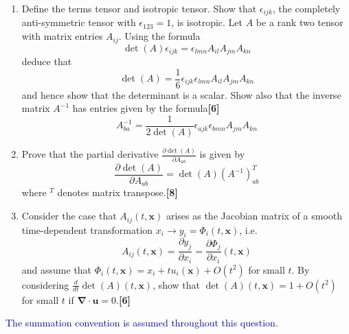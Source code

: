 \documentclass[a4paper]{article}
\begin{document}
\begin{qns}[Tensors]\leavevmode
\begin{enumerate}[label=(\roman*)]
    \item Define the terms tensor and isotropic tensor. Show that $\epsilon_{ijk}$, the completely anti-symmetric tensor with $\epsilon_{123}=1$, is isotropic. Let $A$ be a rank two tensor with matrix entries $A_{ij}$. Using the formula
$$\det(A)\epsilon_{ijk}=\epsilon_{lmn}A_{il}A_{jm}A_{kn}$$
deduce that
$$\det(A)=\frac{1}{6}\epsilon_{ijk}\epsilon_{lmn}A_{il}A_{jm}A_{kn}$$
and hence show that the determinant is a scalar. Show also that the inverse matrix $A^{-1}$ has entries given by the formula\hfill\textbf{[6]}
$$A^{-1}_{ba}=\frac{1}{2\det(A)}\epsilon_{ajk}\epsilon_{bmn}A_{jm}A_{kn}$$
\item Prove that the partial derivative $\frac{\partial\det(A)}{\partial A_{ab}}$ is given by
$$\frac{\partial\det(A)}{\partial A_{ab}}=\det(A)(A^{-1})^T_{ab}$$
where $^T$ denotes matrix transpose.\hfill\textbf{[8]}
\item Consider the case that $A_{ij}(t, \mathbf{x})$ arises as the Jacobian matrix of a smooth time-dependent transformation $x_i\rightarrow y_i=\Phi_i(t,\mathbf{x})$, i.e.
$$A_{ij}(t,\mathbf{x})=\frac{\partial y_j}{\partial x_i}=\frac{\partial\Phi_j}{\partial x_i}(t,\mathbf{x})$$
and assume that $\Phi_i(t, \mathbf{x}) = x_i + tu_i(\mathbf{x}) + O(t^2)$ for small $t$. By considering $\frac{d}{dt}\det(A)(t,\mathbf{x})$, show that $\det(A)(t,\mathbf{x})=1+O(t^2)$ for small $t$ if $\boldsymbol{\nabla}\cdot\mathbf{u}=0$.\hfill\textbf{[6]}
\end{enumerate}
\begin{mdframed}
\textcolor{darkblue}{The summation convention is assumed throughout this question.}
\end{mdframed}
\end{qns}
\end{document}
